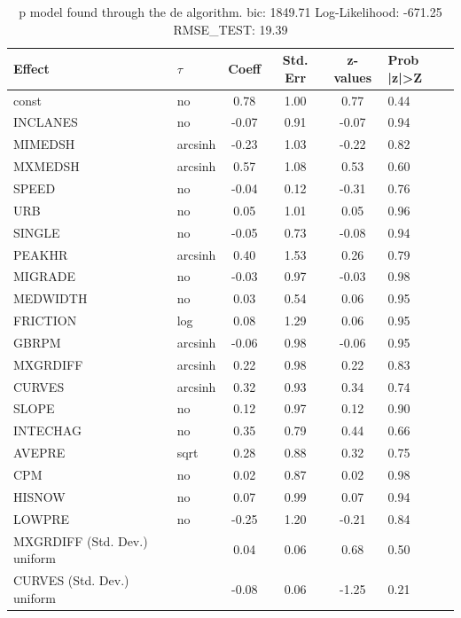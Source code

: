 \begin{table}
	\caption{p model found through the de algorithm. bic: 1849.71 Log-Likelihood: -671.25 RMSE_TEST: 19.39}
	\begin{center}
		\begin{tabular}{|l|l|c|c|c|l|}
			\hline
			Effect & $\tau$ & Coeff & Std. Err & z-values & Prob |z|>Z \\
			\hline
			const & no & 0.78 & 1.00 & 0.77 & 0.44 \\
			\hline
			INCLANES & no & -0.07 & 0.91 & -0.07 & 0.94 \\
			\hline
			MIMEDSH & arcsinh & -0.23 & 1.03 & -0.22 & 0.82 \\
			\hline
			MXMEDSH & arcsinh & 0.57 & 1.08 & 0.53 & 0.60 \\
			\hline
			SPEED & no & -0.04 & 0.12 & -0.31 & 0.76 \\
			\hline
			URB & no & 0.05 & 1.01 & 0.05 & 0.96 \\
			\hline
			SINGLE & no & -0.05 & 0.73 & -0.08 & 0.94 \\
			\hline
			PEAKHR & arcsinh & 0.40 & 1.53 & 0.26 & 0.79 \\
			\hline
			MIGRADE & no & -0.03 & 0.97 & -0.03 & 0.98 \\
			\hline
			MEDWIDTH & no & 0.03 & 0.54 & 0.06 & 0.95 \\
			\hline
			FRICTION & log & 0.08 & 1.29 & 0.06 & 0.95 \\
			\hline
			GBRPM & arcsinh & -0.06 & 0.98 & -0.06 & 0.95 \\
			\hline
			MXGRDIFF & arcsinh & 0.22 & 0.98 & 0.22 & 0.83 \\
			\hline
			CURVES & arcsinh & 0.32 & 0.93 & 0.34 & 0.74 \\
			\hline
			SLOPE & no & 0.12 & 0.97 & 0.12 & 0.90 \\
			\hline
			INTECHAG & no & 0.35 & 0.79 & 0.44 & 0.66 \\
			\hline
			AVEPRE & sqrt & 0.28 & 0.88 & 0.32 & 0.75 \\
			\hline
			CPM & no & 0.02 & 0.87 & 0.02 & 0.98 \\
			\hline
			HISNOW & no & 0.07 & 0.99 & 0.07 & 0.94 \\
			\hline
			LOWPRE & no & -0.25 & 1.20 & -0.21 & 0.84 \\
			\hline
			MXGRDIFF (Std. Dev.) uniform &  & 0.04 & 0.06 & 0.68 & 0.50 \\
			\hline
			CURVES (Std. Dev.) uniform &  & -0.08 & 0.06 & -1.25 & 0.21 \\

\end{tabular}
\end{center}
\end{table}
